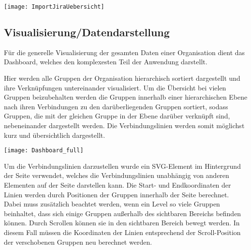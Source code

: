 \vspace{20pt}
\begin{center}
    \begin{minipage}{1\linewidth}
        \texttt{[image: ImportJiraUebersicht]}
    \end{minipage}
\end{center}
\vspace{20pt}

\subsection{Visualisierung/Datendarstellung}
Für die generelle Visualisierung der gesamten Daten einer Organisation dient das Dashboard, welches den komplexesten Teil der Anwendung darstellt.

Hier werden alle Gruppen der Organisation hierarchisch sortiert dargestellt und ihre Verknüpfungen untereinander visualisiert.
Um die Übersicht bei vielen Gruppen beizubehalten werden die Gruppen innerhalb einer hierarchischen Ebene nach ihren Verbindungen zu den darüberliegenden Gruppen sortiert, sodass Gruppen, die mit der gleichen Gruppe in der Ebene darüber verknüpft sind, nebeneinander dargestellt werden. Die Verbindungslinien werden somit möglichst kurz und übersichtlich dargestellt.

\vspace{20pt}
\begin{center}
    \begin{minipage}{1\linewidth}
        \texttt{[image: Dashboard\_full]}
    \end{minipage}
\end{center}
\vspace{20pt}

Um die Verbindungslinien darzustellen wurde ein SVG-Element im Hintergrund der Seite verwendet, welches die Verbindungslinien unabhängig von anderen Elementen auf der Seite darstellen kann. Die Start- und Endkoordinaten der Linien werden durch Positionen der Gruppen innerhalb der Seite berechnet. Dabei muss zusätzlich beachtet werden, wenn ein Level so viele Gruppen beinhaltet, dass sich einige Gruppen außerhalb des sichtbaren Bereichs befinden können. Durch Scrollen können sie in den sichtbaren Bereich bewegt werden. In diesem Fall müssen die Koordinaten der Linien entsprechend der Scroll-Position der verschobenen Gruppen neu berechnet werden.

